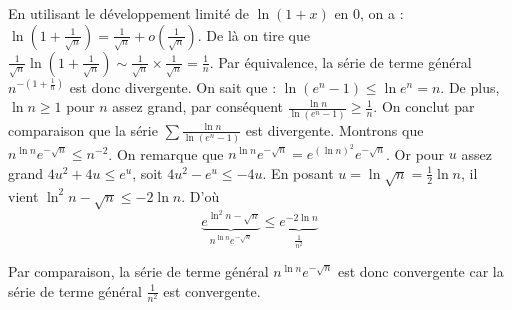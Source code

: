 {{En utilisant le développement limité de $\ln (1 +x)$ en $0$, on a :
$\ln \left(1+\frac{1}{\sqrt{n}}\right) = \frac{1}{\sqrt{n}} + o\left(\frac{1}{\sqrt{n}}\right)$.
De là on tire que $\frac{1}{\sqrt{n}}\ln{\left(1+\frac{1}{\sqrt{n}}\right)} 
\sim \frac{1}{\sqrt{n}} \times \frac{1}{\sqrt{n}} = \frac{1}{n}$.
Par équivalence, la série de terme général $n^{-\left(1+\frac{1}{n}\right) }$ est donc divergente.
On sait que :
$\ln{(e^n-1)} \le \ln{e^n} = n$. De plus, $ \ln n \ge 1$ pour $n$  assez grand, par conséquent
$\frac{\ln n}{\ln (e^n-1)} \ge \frac{1}{n}$. On conclut par comparaison 
que la série $\sum \frac{\ln n }{\ln{(e^n-1)}}$ est divergente.
Montrons que $n^{\ln n }e^{-\sqrt{n}} \le n^{-2}$.
On remarque que $ n^{\ln n }e^{-\sqrt{n}} = e^{(\ln n)^2}e^{-\sqrt{n}}$. 
Or pour $u$ assez grand $4u^2 + 4u \le e^u $, soit $4u^2 - e^u \le - 4u$.
En posant $u = \ln \sqrt{n} = \frac{1}{2} \ln n$, il vient $\ln^2{n} - \sqrt{n} \le -2\ln n$.
D'où 
\[
\underbrace{e^{\ln^2{n}-\sqrt{n}}}_{n^{\ln n }e^{-\sqrt{n}}} \le \underbrace{e^{-2\ln n }}_{\frac{1}{n^2}}
\]

Par comparaison, la série de terme général $n^{\ln n }e^{-\sqrt{n} }$ est donc convergente 
car la série de terme général $\frac{1}{n^2}$ est convergente.
}
}
